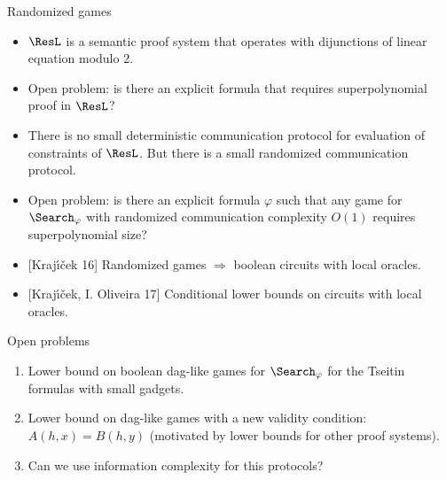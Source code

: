 \begin{frame}{Randomized games}

    \begin{itemize}
        \item $\ResL$ is a semantic proof system that operates with dijunctions of linear equation modulo
            $2$.
        \pause    
        \item Open problem: is there an explicit formula that requires superpolynomial proof in $\ResL$?
        \pause
        \item There is no small deterministic communication protocol for evaluation of constraints of
            $\ResL$. But there is a small randomized communication protocol.
        \pause
        \item Open problem: is there an explicit formula $\varphi$ such that any game for
            $\Search_{\varphi}$ with randomized communication complexity $O(1)$ requires superpolynomial
            size?
        \pause
        \item {[Kraj{\'{\i}}{\v{c}}ek 16]} Randomized games \alert{$\Rightarrow$} boolean circuits with
            local oracles.
        \pause
        \item {[Kraj{\'{\i}}{\v{c}}ek, I. Oliveira 17]} Conditional lower bounds on circuits with local
            oracles.
    \end{itemize}
\end{frame}


\begin{frame}{Open problems}
    \begin{enumerate}
            
        \pause
        \item Lower bound on boolean dag-like games for $\Search_{\varphi}$ for the Tseitin formulas with
            small gadgets.
        \pause
        \item Lower bound on dag-like games with a new validity condition: $A(h, x) = B(h, y)$ (motivated
            by lower bounds for other proof systems).
        \pause
        \item Can we use information complexity for this protocols?
    \end{enumerate}
\end{frame}